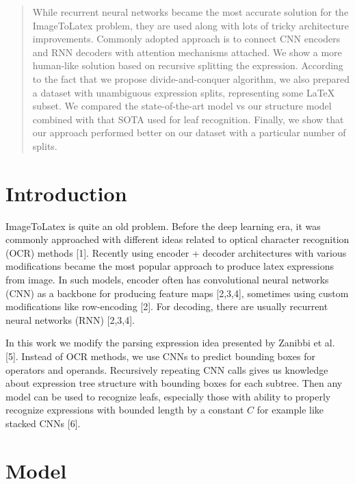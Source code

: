 \documentclass{sciposter}
\begin{document}
\begin{multicols}{3}

\begin{abstract}
While recurrent neural networks became the most accurate solution for the ImageToLatex problem, they are used along with lots of tricky architecture improvements. Commonly adopted approach is to connect CNN encoders and RNN decoders with attention mechanisms attached. We show a more human-like solution based on recursive splitting the expression. According to the fact that we propose divide-and-conquer algorithm, we also prepared a dataset with unambiguous expression splits, representing some LaTeX subset. We compared the state-of-the-art model vs our structure model combined with that SOTA used for leaf recognition. Finally, we show that our approach performed better on our dataset with a particular number of splits.


\end{abstract}

\section{Introduction}
ImageToLatex is quite an old problem. Before the deep learning era, it was commonly approached with different ideas related to optical character recognition (OCR) methods [1]. Recently using encoder + decoder architectures with various modifications became the most popular approach to produce latex expressions from image. In such models, encoder often has convolutional neural networks (CNN) as a backbone for producing feature maps [2,3,4], sometimes using custom modifications like row-encoding [2]. For decoding, there are usually recurrent neural networks (RNN) [2,3,4]. 

In this work we modify the parsing expression idea presented by Zanibbi et al. [5]. Instead of OCR methods, we use CNNs to predict bounding boxes for operators and operands. Recursively repeating CNN calls gives us knowledge about expression tree structure with bounding boxes for each subtree. Then any model can be used to recognize leafs, especially those with ability to properly recognize expressions with bounded length by a constant $C$ for example like stacked CNNs [6].

\section{Model}

\end{multicols}
\end{document}
